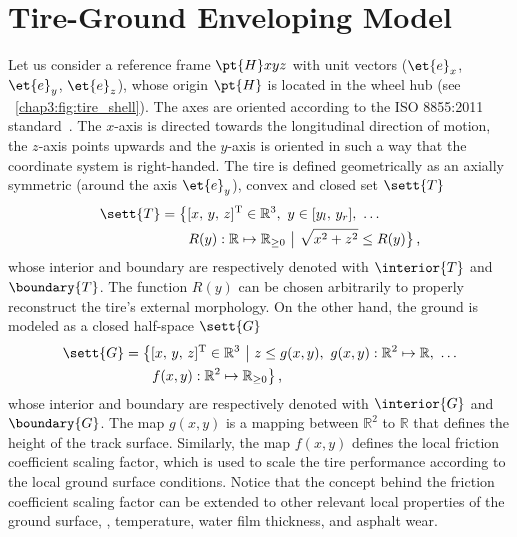 
\section{Tire-Ground Enveloping Model}
\label{chap3:Model}

Let us consider a reference frame $\pt{H}xyz$ with unit vectors ($\et{e}_x$, $\et{e}_y$, $\et{e}_z$), whose origin $\pt{H}$ is located in the wheel hub (see \figurename{}~\ref{chap3:fig:tire_shell}). The axes are oriented according to the ISO 8855:2011 standard~\cite{iso88552011}. The $x$-axis is directed towards the longitudinal direction of motion, the $z$-axis points upwards and the $y$-axis is oriented in such a way that the coordinate system is right-handed. The tire is defined geometrically as an axially symmetric (around the axis $\et{e}_y$), convex and closed set $\sett{T}$
%
\begin{equation}
  \begin{split}
    \begin{aligned}
      \sett{T} &= \big\{ [x, \, y, \, z]^\mathrm{T} \in \mathbb{R}^3, ~ y \in [ y_l, \, y_r ], ~ \dots \\
      & \qquad R(y):\mathbb{R} \mapsto \mathbb{R}_{\geq 0} ~ \big\lvert ~ \sqrt{x^2+z^2} \leq R(y) \big\}
      \,\text{,}
    \end{aligned}
  \end{split}
\end{equation}
%
whose interior and boundary are respectively denoted with $\interior{T}$ and $\boundary{T}$. The function $R(y)$ can be chosen arbitrarily to properly reconstruct the tire's external morphology. On the other hand, the ground is modeled as a closed half-space $\sett{G}$
%
\begin{equation}
  \begin{split}
    \begin{aligned}
      \sett{G} &= \big\{ [x, \, y, \, z]^\mathrm{T} \in \mathbb{R}^3 ~ \big\lvert ~ z \leq g(x,y), ~ g(x,y):\mathbb{R}^2 \mapsto \mathbb{R}, ~ \dots \\
      & \qquad f(x,y):\mathbb{R}^2 \mapsto \mathbb{R}_{\geq 0}\big\}
      \,\text{,}
    \end{aligned}
  \end{split}
\end{equation}
%
whose interior and boundary are respectively denoted with $\interior{G}$ and $\boundary{G}$. The map $g(x,y)$ is a mapping between $\mathbb{R}^2$ to $\mathbb{R}$ that defines the height of the track surface. Similarly, the map $f(x,y)$ defines the local friction coefficient scaling factor, which is used to scale the tire performance according to the local ground surface conditions. Notice that the concept behind the friction coefficient scaling factor can be extended to other relevant local properties of the ground surface, \eg{}, temperature, water film thickness, and asphalt wear.

